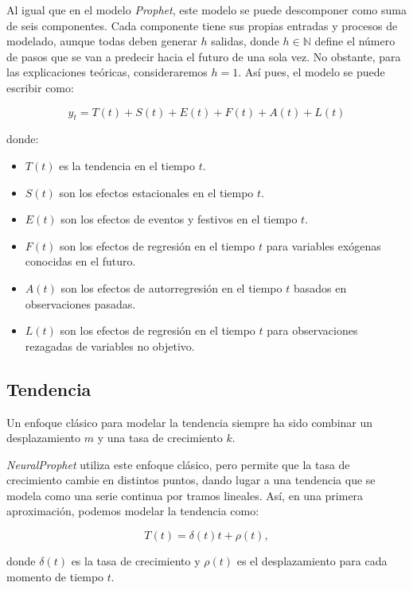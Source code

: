 \documentclass[12pt,twoside]{article}
\begin{document}
Al igual que en el modelo \textit{Prophet}, este modelo se puede descomponer como suma de seis componentes. Cada componente tiene sus propias entradas y procesos de modelado, aunque todas deben generar $h$ salidas, donde $h \in \mathbb{N}$ define el número de pasos que se van a predecir hacia el futuro de una sola vez. No obstante, para las explicaciones teóricas, consideraremos $h=1$. Así pues, el modelo se puede escribir como: 

\begin{equation}
\hat{y}_t = T(t) + S(t) + E(t) + F(t) + A(t) + L(t)
\end{equation}

donde:

\begin{itemize}
    \item $T(t)$ es la tendencia en el tiempo $t$.
    \item $S(t)$ son los efectos estacionales en el tiempo $t$.
    \item $E(t)$ son los efectos de eventos y festivos en el tiempo $t$.
    \item $F(t)$ son los efectos de regresión en el tiempo $t$ para variables exógenas conocidas en el futuro.
    \item $A(t)$ son los efectos de autorregresión en el tiempo $t$ basados en observaciones pasadas.
    \item $L(t)$ son los efectos de regresión en el tiempo $t$ para observaciones rezagadas de variables no objetivo.
\end{itemize}

\subsection{Tendencia}\label{sec:22}

Un enfoque clásico para modelar la tendencia siempre ha sido combinar un desplazamiento $m$ y una tasa de crecimiento $k$.

\textit{NeuralProphet} utiliza este enfoque clásico, pero permite que la tasa de crecimiento cambie en distintos puntos, dando lugar a una tendencia que se modela como una serie continua por tramos lineales. Así, en una primera aproximación, podemos modelar la tendencia como: 

\begin{equation}
T(t) = \delta(t)t + \rho(t),
\label{eq:eq1}
\end{equation}

donde $\delta(t)$ es la tasa de crecimiento y $\rho(t)$ es el desplazamiento para cada momento de tiempo $t$.
\end{document}
